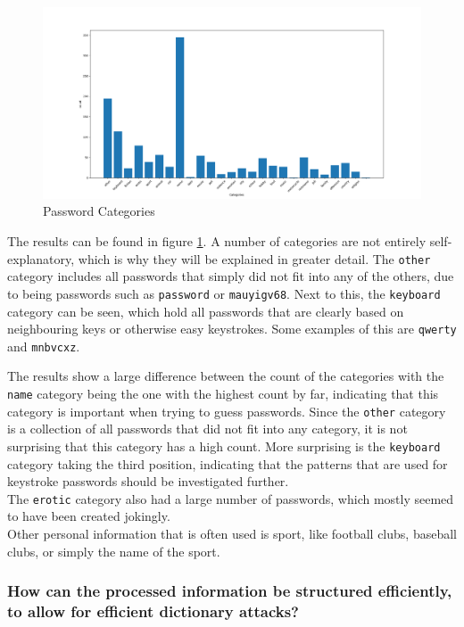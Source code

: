 \documentclass[a4paper,12pt]{article}
\begin{document}
\begin{figure}[!ht]
  \centering
  \hspace*{-4.3cm}
  \includegraphics[width=1.7\textwidth]{password_categories}
  \caption{Password Categories}
  \label{fig:pcat}
\end{figure}

The results can be found in figure \ref{fig:pcat}. A number of categories are not entirely self-explanatory, which is why they will be explained in greater detail. The \lstinline{other} category includes all passwords that simply did not fit into any of the others, due to being passwords such as \lstinline{password} or \lstinline{mauyigv68}. Next to this, the \lstinline{keyboard} category can be seen, which hold all passwords that are clearly based on neighbouring keys or otherwise easy keystrokes. Some examples of this are \lstinline{qwerty} and \lstinline{mnbvcxz}.

The results show a large difference between the count of the categories with the \lstinline{name} category being the one with the highest count by far, indicating that this category is important when trying to guess passwords. Since the \lstinline{other} category is a collection of all passwords that did not fit into any category, it is not surprising that this category has a high count. More surprising is the \lstinline{keyboard} category taking the third position, indicating that the patterns that are used for keystroke passwords should be investigated further.\\
The \lstinline{erotic} category also had a large number of passwords, which mostly seemed to have been created jokingly.\\

Other personal information that is often used is sport, like football clubs, baseball clubs, or simply the name of the sport.

\subsubsection{How can the processed information be structured efficiently, to allow for efficient dictionary attacks?}
\end{document}
